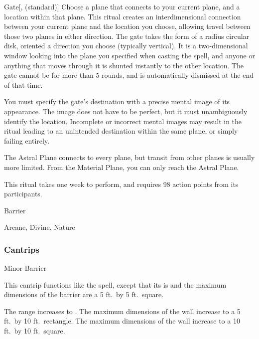 \lowercase{\hypertarget{spell:Gate}{}}\label{spell:Gate}
\begin{apability}[Rank 8]{\hypertarget{spell:Gate}{Gate}}[,  (standard)]
Choose a plane that connects to your current plane, and a location within that plane.
This ritual creates an interdimensional connection between your current plane and the location you choose, allowing travel between those two planes in either direction.
The gate takes the form of a \areasmall radius circular disk, oriented a direction you choose (typically vertical).
It is a two-dimensional window looking into the plane you specified when casting the spell, and anyone or anything that moves through it is shunted instantly to the other location.
The gate cannot be  for more than 5 rounds, and is automatically dismissed at the end of that time.

You must specify the gate's destination with a precise mental image of its appearance.
The image does not have to be perfect, but it must unambiguously identify the location.
Incomplete or incorrect mental images may result in the ritual leading to an unintended destination within the same plane, or simply failing entirely.

The Astral Plane connects to every plane, but transit from other planes is usually more limited.
From the Material Plane, you can only reach the Astral Plane.

This ritual takes one week to perform, and requires 98 action points from its participants.
\end{apability}
\vspace{0.25em}


\newpage
\begin{spellsection}{Barrier}

\begin{spellheader}
\end{spellheader}


 Arcane, Divine, Nature

\subsubsection{Cantrips}


\begin{freeability}{Minor Barrier}

This cantrip functions like the  spell, except that its  is \rngclose and the maximum dimensions of the barrier are a 5 ft.\ by 5 ft.\ square.

\rankline
{} The range increases to \rngmed.
 The maximum dimensions of the wall increase to a 5 ft.\ by 10 ft.\ rectangle.
 The maximum dimensions of the wall increase to a 10 ft.\ by 10 ft.\ square.
\end{freeability}

\end{spellsection}


